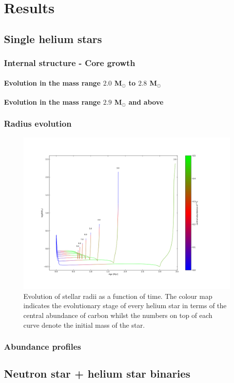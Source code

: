 \documentclass[../../main/thesis_msc.tex]{subfiles}
\begin{document}
	\chapter{Results}
	
		
		
			\section{Single helium stars}
			
				\subsection{Internal structure - Core growth}
				
					\subsubsection{Evolution in the mass range $2.0$ M$_{\odot}$ to $2.8$ M$_{\odot}$}
					
					\subsubsection{Evolution in the mass range $2.9$ M$_{\odot}$ and above}
				
				
				\subsection{Radius evolution}
					
				
					\begin{figure}[h]
						\centering
						\includegraphics[scale=0.4]{../figures/chapter3/radius_evolution_gradient.png}
						\caption{Evolution of stellar radii as a function of time. The colour map indicates the evolutionary stage of every helium star in terms of the central abundance of carbon whilst the numbers on top of each curve denote the initial mass of the star.}
						\label{fig:radii_singles}
					\end{figure}
				
				
				\subsection{Abundance profiles}	
			
			
			
			\section{Neutron star + helium star binaries}
\end{document}
